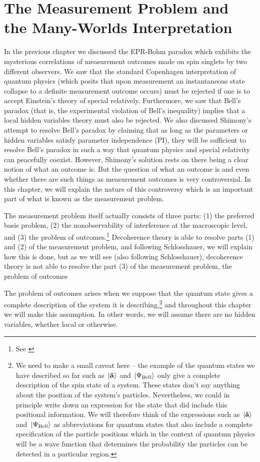 \chapter{The Measurement Problem and the Many-Worlds Interpretation}
In the previous chapter we discussed the EPR-Bohm paradox which exhibits the mysterious correlations of measurement outcomes made on spin singlets by two different observers. We saw that the standard Copenhagen interpretation of quantum physics (which posits that upon measurement  an instantaneous state collapse to a definite measurement outcome occurs) must be rejected if one is to accept Einstein's theory of special relatively. Furthermore, we saw that Bell's paradox (that is, the experimental violation of Bell's inequality) implies that a local hidden variables theory must also be rejected. We also discussed Shimony's attempt to resolve Bell's paradox by claiming that as long as the parameters or hidden variables satisfy parameter independence (PI), they will be sufficient to resolve Bell's paradox in such a way that quantum physics and special relativity can peacefully coexist. However, Shimony's solution rests on there being a clear notion of what an outcome is. But the question of what an outcome is and even whether there are such things as measurement outcomes is very controversial. In this chapter, we will explain the nature of this controversy which is an important part of what is known as the measurement problem. 

The measurement problem itself actually consists of three parts: (1) the preferred basis problem, (2) the nonobservability of interference at the macroscopic level, and (3) the problem of outcomes.\footnote{See \cite[50]{Schlosshauer}} 
Decoherence theory is able to resolve parts (1) and (2) of the measurement problem, and following Schlosshauer, we will explain how this is done, but as we will see (also following Schlosshauer), decoherence theory is not able to resolve the part (3) of the measurement problem, the problem of outcomes



The problem of outcomes arises when we suppose that the quantum state gives a complete description of the system it is describing,\footnote{We need to make a small caveat here -- the example of the quantum states we have described so far such as $\ket*{\vb{\hat{{a}}}}$ and $\ket*{\Psi_{\text{Bell}}}$ only give a complete description of the spin state of a system. These states don't say anything about the position of the system's particles. Nevertheless, we could in principle write down an expression for the state that did include this positional information. We will therefore think of the expressions such as $\ket*{\vb{\hat{{a}}}}$ and $\ket*{\Psi_{\text{Bell}}}$ as abbreviations for quantum states that also include a complete specification of the particle positions which in the context of quantum physics will be a wave function that determines the probability the particles can be detected in a particular region.} and throughout this chapter we will make this assumption. In other words, we will assume there are no hidden variables, whether local or otherwise. 

